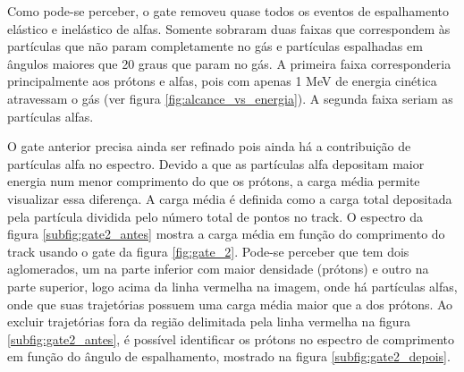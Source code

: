 \documentclass[a4paper,12pt,oneside]{book}
\begin{document}
\par Como pode-se perceber, o gate removeu quase todos os eventos de espalhamento elástico e inelástico de alfas. Somente sobraram duas faixas que correspondem às partículas que não param completamente no gás e partículas espalhadas em ângulos maiores que 20 graus que param no gás. A primeira faixa corresponderia principalmente aos prótons e alfas, pois com apenas 1 MeV de energia cinética atravessam o gás (ver figura \ref{fig:alcance_vs_energia}). A segunda faixa seriam as partículas alfas.


\par O gate anterior precisa ainda ser refinado pois ainda há a contribuição de partículas alfa no espectro. Devido a que as partículas alfa depositam maior energia num menor comprimento do que os prótons, a carga média permite visualizar essa diferença. A carga média é definida como a carga total depositada pela partícula dividida pelo número total de pontos no track. O espectro da figura \ref{subfig:gate2_antes} mostra a carga média em função do comprimento do track usando o gate da figura \ref{fig:gate_2}. Pode-se perceber que tem dois aglomerados, um na parte inferior com maior densidade (prótons) e outro na parte superior, logo acima da linha vermelha na imagem, onde há partículas alfas, onde que suas trajetórias possuem uma carga média maior que a dos prótons. Ao excluir trajetórias fora da região delimitada pela linha vermelha na figura \ref{subfig:gate2_antes}, é possível identificar os prótons no espectro de comprimento em função do ângulo de espalhamento, mostrado na figura \ref{subfig:gate2_depois}.



\end{document}
